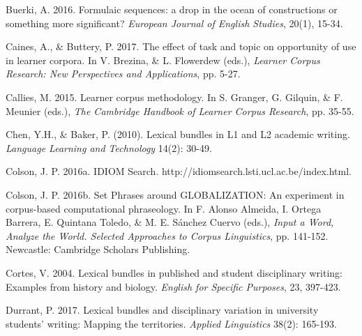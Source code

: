 \begin{styleStandard}
Buerki, A. 2016. Formulaic sequences: a drop in the ocean of constructions or something more significant? \textit{European Journal of English Studies},\textit{ }20(1), 15-34.
\end{styleStandard}

\begin{styleStandard}
Caines, A., \& Buttery, P. 2017. The effect of task and topic on opportunity of use in learner corpora. In V. Brezina, \& L. Flowerdew (eds.), \textit{Learner Corpus Research: New Perspectives and Applications}, pp. 5-27.
\end{styleStandard}

\begin{styleStandard}
Callies, M. 2015. Learner corpus methodology. In S. Granger, G. Gilquin, \& F. Meunier (eds.), \textit{The Cambridge Handbook of Learner Corpus Research}, pp. 35-55.
\end{styleStandard}

\begin{styleStandard}
Chen, Y.H., \& Baker, P. (2010). Lexical bundles in L1 and L2 academic writing. \textit{Language Learning and Technology }14(2): 30-49.
\end{styleStandard}

\begin{styleStandard}
Colson, J. P. 2016a. IDIOM Search. http://idiomsearch.lsti.ucl.ac.be/index.html.
\end{styleStandard}

\begin{styleStandard}
Colson, J. P. 2016b. Set Phrases around GLOBALIZATION: An experiment in corpus-based computational phraseology. In F. Alonso Almeida, I. Ortega Barrera, E. Quintana Toledo, \& M. E. Sánchez Cuervo (eds.), \textit{Input a Word, Analyze the World. Selected Approaches to Corpus Linguistics}, pp. 141-152.\textit{ }Newcastle: Cambridge Scholars Publishing.
\end{styleStandard}

\begin{styleStandard}
Cortes, V. 2004. Lexical bundles in published and student disciplinary writing: Examples from history and biology. \textit{English for Specific Purposes},\textit{ }23, 397-423.
\end{styleStandard}

\begin{styleStandard}
Durrant, P. 2017. Lexical bundles and disciplinary variation in university students’ writing: Mapping the territories. \textit{Applied Linguistics }38(2): 165-193.
\end{styleStandard}


